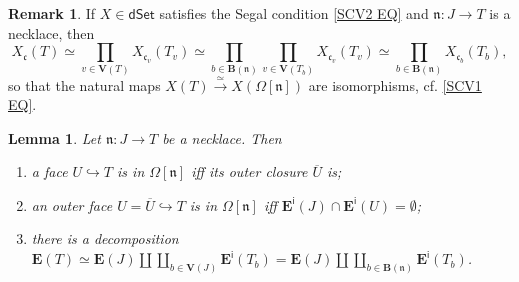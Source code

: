 \documentclass[a4paper,10pt]{article}%
\numberwithin{equation}{section}
\numberwithin{figure}{section}
\newtheorem{lemma}[equation]{Lemma}%
\theoremstyle{definition} %
\newtheorem{remark}[equation]{Remark}%
\newcommand{\dSet}{\mathsf{dSet}}
\begin{document}
\begin{remark}\label{SEGFORNECK REM}
	If $X\in \dSet$ satisfies the Segal condition \eqref{SCV2 EQ}
	and $\mathfrak{n}\colon J \to T$ is a necklace, then	
	\[
                X_{\mathfrak{c}}(T)
                \simeq 
                \prod_{v \in \boldsymbol{V}(T)}
                X_{\mathfrak{c}_v}(T_v)
                \simeq
                \prod_{b \in \boldsymbol{B}(\mathfrak{n})}
                \prod_{v \in \boldsymbol{V}(T_b)}
                X_{\mathfrak{c}_v}(T_v)
                \simeq
                \prod_{b \in \boldsymbol{B}(\mathfrak{n})}
                X_{\mathfrak{c}_b}(T_b),
	\]
	so that the natural maps
	$X(T) \xrightarrow{\simeq} X(\Omega[\mathfrak{n}])$
	are isomorphisms, cf. \eqref{SCV1 EQ}.
\end{remark}





\begin{lemma}\label{FACEINNECK LEM}
	Let $\mathfrak{n} \colon J \to T$ be a necklace. Then
	\begin{enumerate}[label=(\roman*)]
		\item a face $U \hookrightarrow T$
		is in $\Omega[\mathfrak{n}]$
		iff its outer closure $\overline{U}$ is; 
		\item an outer face 
		$U = \overline{U} \hookrightarrow T$
		is in $\Omega[\mathfrak{n}]$ iff 
		$\boldsymbol{E}^{\mathsf{i}}(J) \cap 
		\boldsymbol{E}^{\mathsf{i}}(U) = \emptyset$;
		\item there is a decomposition
		$
		\boldsymbol{E}(T) \simeq
		\boldsymbol{E}(J) \amalg 
		\coprod_{b \in \boldsymbol{V}(J)}
		\boldsymbol{E}^{\mathsf{i}}(T_b)
		= 
		\boldsymbol{E}(J) \amalg 
		\coprod_{b \in \boldsymbol{B}(\mathfrak{n})}
		\boldsymbol{E}^{\mathsf{i}}(T_b)
		$.
	\end{enumerate}
\end{lemma}
\end{document}
